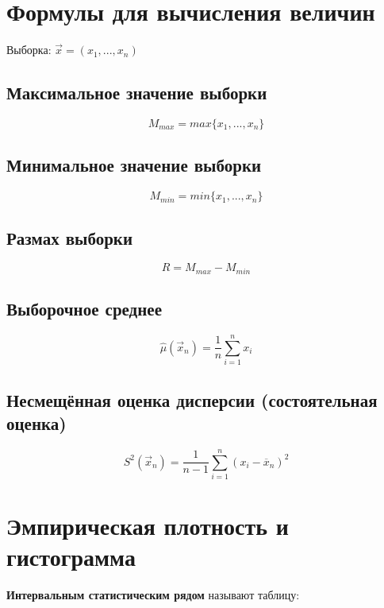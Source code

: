 \section{Формулы для вычисления величин}
Выборка:  $\vec{x} = (x_1, ..., x_n) $

\subsection{Максимальное значение выборки}
\begin{equation}
	M_{max} = max\{x_1, ..., x_n\}
\end{equation}

\subsection{Минимальное значение выборки}
\begin{equation}
	M_{min} = min\{x_1, ..., x_n\}
\end{equation}

\subsection{Размах выборки}
\begin{equation}
	R = M_{max} - M_{min}
\end{equation}

\subsection{Выборочное среднее}
\begin{equation}
	\hat\mu(\vec x_n) = \frac 1n \sum_{i=1}^n x_i
\end{equation}

\subsection{Несмещённая оценка дисперсии (состоятельная оценка)}
\begin{equation}
	S^2(\vec x_n) = \frac 1{n-1} \sum_{i=1}^n (x_i-\overline x_n)^2
\end{equation}


\section{Эмпирическая плотность и гистограмма}
\textbf{Интервальным статистическим рядом} называют таблицу:  \\  

